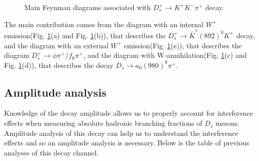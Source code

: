 {\begin{figure}[h]
        \caption{Main Feynman diagrams associated with $D_{s}^{+} \rightarrow K^{+}K^{-}\pi^{+}$ decay.}
        \label{Feynman-dia}
    \end{figure}
    The main contribution comes from the diagram with an internal $W^{+}$ emission(Fig. \ref{Feynman-dia}(a) and Fig. \ref{Feynman-dia}(b)), that describes the $D_{s}^{+} \rightarrow \bar{K}^{*}(892)^{0}K^{+}$ decay, 
    and the diagram with an external $W^{+}$ emission(Fig. \ref{Feynman-dia}(e)), that describes the diagram $D_{s}^{+} \rightarrow \phi\pi^{+}/ f_{0}\pi^{+}$, 
    and the diagram with W-annihilation(Fig. \ref{Feynman-dia}(c) and Fig. \ref{Feynman-dia}(d)), that describes the decay $D_{s} \rightarrow a_{0}(980)^{0}\pi^{+}$.
}
    
\subsection{Amplitude analysis}
\par{
    Knowledge of the decay amplitude allows us to properly account for interference effects when measuring absolute hadronic branching fractions of $D_{s}$ mesons.
    Amplitude analysis of this decay can help us to understand the interference effects and so an amplitude analysis is necessary.
Below is the table of previous analyses of this decay channel.}

